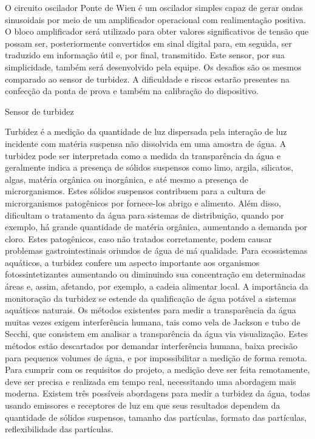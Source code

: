 O circuito oscilador Ponte de Wien é um oscilador simples capaz de gerar ondas sinusoidais por meio de um amplificador operacional com realimentação positiva.
O bloco amplificador será utilizado para obter valores significativos de tensão que possam ser, posteriormente convertidos em sinal digital para, em seguida, ser traduzido em informação útil e, por final, transmitido. Este sensor, por sua simplicidade, também será desenvolvido pela equipe.
Os desafios são os mesmos comparado ao sensor de turbidez. A dificuldade e riscos estarão presentes na confecção da ponta de prova e também na calibração do dispositivo.

Sensor de turbidez
 
Turbidez é a medição da quantidade de luz dispersada pela interação de luz incidente com matéria suspensa não dissolvida em uma amostra de água. A turbidez pode ser interpretada como a medida da transparência da água e geralmente indica a presença de sólidos suspensos como limo, argila, silicatos, algas, matéria orgânica ou inorgânica, e até mesmo a presença de microrganismos. Estes sólidos suspensos contribuem para a cultura de microrganismos patogênicos por fornece-los abrigo e alimento. Além disso, dificultam o tratamento da água para sistemas de distribuição, quando por exemplo, há grande quantidade de matéria orgânica, aumentando a demanda por cloro. Estes patogênicos, caso não tratados corretamente, podem causar problemas gastrointestinais oriundos de água de má qualidade. Para ecossistemas aquáticos, a turbidez confere um aspecto importante aos organismos fotossintetizantes aumentando ou diminuindo sua concentração em determinadas áreas e, assim, afetando, por exemplo, a cadeia alimentar local. A importância da monitoração da turbidez se estende da qualificação de água potável a sistemas aquáticos naturais.
Os métodos existentes para medir a transparência da água muitas vezes exigem interferência humana, tais como vela de Jackson e tubo de Secchi, que consistem em analisar a transparência da água via visualização. Estes métodos estão descartados por demandar interferência humana, baixa precisão para pequenos volumes de água, e por impossibilitar a medição de forma remota. Para cumprir com os requisitos do projeto, a medição deve ser feita remotamente, deve ser precisa e realizada em tempo real, necessitando uma abordagem mais moderna. Existem três possíveis abordagens para medir a turbidez da água, todas usando emissores e receptores de luz em que seus resultados dependem da quantidade de sólidos suspensos, tamanho das partículas, formato das partículas, reflexibilidade das partículas.

